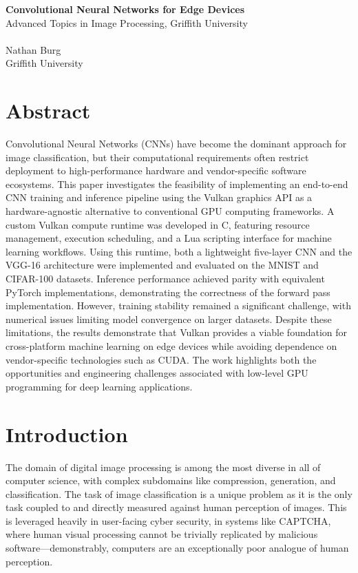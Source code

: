\documentclass[10pt, a4paper]{article}
\begin{document}
{\noindent\LARGE\textbf{Convolutional Neural Networks for Edge Devices}}\\[0.1cm]
{\noindent\large Advanced Topics in Image Processing, Griffith University}\\
\\
{\noindent\large Nathan Burg\\Griffith University}

\section*{Abstract}
Convolutional Neural Networks (CNNs) have become the dominant approach for image classification, but their computational requirements often restrict deployment to high-performance hardware and vendor-specific software ecosystems. This paper investigates the feasibility of implementing an end-to-end CNN training and inference pipeline using the Vulkan graphics API as a hardware-agnostic alternative to conventional GPU computing frameworks. A custom Vulkan compute runtime was developed in C, featuring resource management, execution scheduling, and a Lua scripting interface for machine learning workflows. Using this runtime, both a lightweight five-layer CNN and the VGG-16 architecture were implemented and evaluated on the MNIST and CIFAR-100 datasets. Inference performance achieved parity with equivalent PyTorch implementations, demonstrating the correctness of the forward pass implementation. However, training stability remained a significant challenge, with numerical issues limiting model convergence on larger datasets. Despite these limitations, the results demonstrate that Vulkan provides a viable foundation for cross-platform machine learning on edge devices while avoiding dependence on vendor-specific technologies such as CUDA. The work highlights both the opportunities and engineering challenges associated with low-level GPU programming for deep learning applications.

\section{Introduction}
The domain of digital image processing is among the most diverse in all of computer science, with complex subdomains like compression, generation, and classification. The task of image classification is a unique problem as it is the only task coupled to and directly measured against human perception of images. This is leveraged heavily in user-facing cyber security, in systems like CAPTCHA, where human visual processing cannot be trivially replicated by malicious software\cite{goos_captcha_2003}---demonstrably, computers are an exceptionally poor analogue of human perception.
\end{document}
